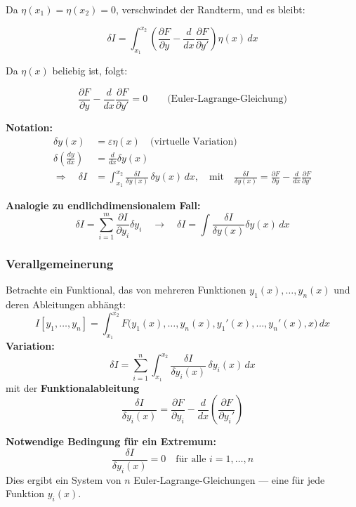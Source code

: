 \documentclass[10pt, letterpaper]{article}
\begin{document}
Da \( \eta(x_1) = \eta(x_2) = 0 \), verschwindet der Randterm, und es bleibt:

\[
\delta I = \int_{x_1}^{x_2} \left( \frac{\partial F}{\partial y} - \frac{d}{dx} \frac{\partial F}{\partial y'} \right) \eta(x)\, dx
\]

Da \( \eta(x) \) beliebig ist, folgt:

\[
\boxed{
\frac{\partial F}{\partial y} - \frac{d}{dx} \frac{\partial F}{\partial y'} = 0
}
\qquad \text{(Euler-Lagrange-Gleichung)}
\]

\vspace{1em}
\textbf{Notation:}
\begin{align*}
\delta y(x) &= \varepsilon \eta(x) \quad \text{(virtuelle Variation)} \\
\delta \left( \frac{dy}{dx} \right) &= \frac{d}{dx} \delta y(x) \\
\Rightarrow \quad \delta I &= \int_{x_1}^{x_2} \frac{\delta I}{\delta y(x)}\, \delta y(x)\, dx, \quad 
\text{mit} \quad \frac{\delta I}{\delta y(x)} = \frac{\partial F}{\partial y} - \frac{d}{dx} \frac{\partial F}{\partial y'}
\end{align*}

\vspace{0.5em}
\textbf{Analogie zu endlichdimensionalem Fall:}
\[
\delta I = \sum_{i=1}^m \frac{\partial I}{\partial y_i} \delta y_i \quad 
\longrightarrow \quad 
\delta I = \int \frac{\delta I}{\delta y(x)} \delta y(x)\, dx
\]




\subsubsection{Verallgemeinerung}

Betrachte ein Funktional, das von mehreren Funktionen \( y_1(x), \dots, y_n(x) \) und deren Ableitungen abhängt:
\[
I[y_1,\dots,y_n] = \int_{x_1}^{x_2} F\big(y_1(x),\dots,y_n(x),y_1'(x),\dots,y_n'(x),x\big)\, dx
\]
\textbf{Variation:}
\[
\delta I = \sum_{i=1}^n \int_{x_1}^{x_2} \frac{\delta I}{\delta y_i(x)}\, \delta y_i(x)\, dx
\]
mit der \textbf{Funktionalableitung}
\[
\frac{\delta I}{\delta y_i(x)} = \frac{\partial F}{\partial y_i} - \frac{d}{dx} \left( \frac{\partial F}{\partial y_i'} \right)
\]

\vspace{0.5em}
\textbf{Notwendige Bedingung für ein Extremum:}
\[
\boxed{
\frac{\delta I}{\delta y_i(x)} = 0 \quad \text{für alle } i = 1,\dots,n
}
\]
Dies ergibt ein System von \( n \) Euler-Lagrange-Gleichungen — eine für jede Funktion \( y_i(x) \).
\end{document}
